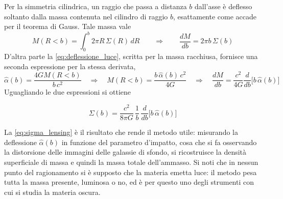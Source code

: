 Per la simmetria cilindrica, un raggio che passa a distanza $b$ dall'asse è deflesso soltanto dalla massa contenuta nel cilindro di raggio $b$, esattamente come accade per il teorema di Gauss. Tale massa vale
%
\begin{equation*}
    M(R<b) = \int_0^b 2\pi R \, \Sigma(R) \, dR \qquad \Longrightarrow \qquad \frac{dM}{db} = 2\pi b \, \Sigma(b)
\end{equation*}
D'altra parte la \eqref{eq:deflessione_luce}, scritta per la massa racchiusa, fornisce una seconda espressione per la stessa derivata,
%
\begin{equation*}
    \hat\alpha(b) = \frac{4GM(R<b)}{b\,c^2} \quad \Longrightarrow \quad M(R<b) = \frac{b \, \hat\alpha(b) \, c^2}{4G} \quad \Longrightarrow \quad \frac{dM}{db} = \frac{c^2}{4G}\frac{d}{db}\Big[b \, \hat\alpha(b)\Big]
\end{equation*}
Uguagliando le due espressioni si ottiene

\begin{tcolorbox}[colback=black!5!white, colframe=black!45!white, boxrule=0.8pt]
\begin{equation}
    \Sigma(b) = \frac{c^2}{8\pi G}\,\frac{1}{b}\,\frac{d}{db}\Big[b \, \hat\alpha(b)\Big]
    \label{eq:sigma_lensing}
\end{equation}
\end{tcolorbox}
La \eqref{eq:sigma_lensing} è il risultato che rende il metodo utile: misurando la deflessione $\hat\alpha(b)$ in funzione del parametro d'impatto, cosa che si fa osservando la distorsione delle immagini delle galassie di sfondo, si ricostruisce la densità superficiale di massa e quindi la massa totale dell'ammasso. Si noti che in nessun punto del ragionamento si è supposto che la materia emetta luce: il metodo pesa tutta la massa presente, luminosa o no, ed è per questo uno degli strumenti con cui si studia la materia oscura.